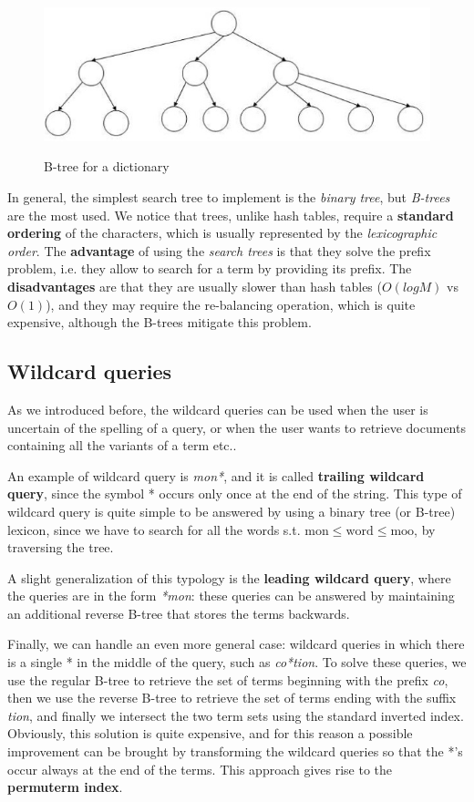 \begin{figure}[h!]
		\centering
		\includegraphics[scale = 1.8]{img/b tree.jpg}
		\label{b tree}
        \caption{B-tree for a dictionary}
\end{figure}

In general, the simplest search tree to implement is the \textit{binary tree}, but \textit{B-trees} are the most used. We notice that trees, unlike hash tables, require a \textbf{standard ordering} of the characters, which is usually represented by the \textit{lexicographic order}. The \textbf{advantage} of using the \textit{search trees} is that they solve the prefix problem, i.e. they allow to search for a term by providing its prefix. The \textbf{disadvantages} are that they are usually slower than hash tables ($O(log M)$ vs $O(1)$), and they may require the re-balancing operation, which is quite expensive, although the B-trees mitigate this problem.

\subsection{Wildcard queries}\label{4.2}
As we introduced before, the wildcard queries can be used when the user is uncertain of the spelling of a query, or when the user wants to retrieve documents containing all the variants of a term etc..

An example of wildcard query is \textit{mon*}, and it is called \textbf{trailing wildcard query}, since the symbol * occurs only once at the end of the string. This type of wildcard query is quite simple to be answered by using a binary tree (or B-tree) lexicon, since we have to search for all the words s.t. $\text{mon} \leq \text{word} \leq \text{moo}$, by traversing the tree.

A slight generalization of this typology is the \textbf{leading wildcard query}, where the queries are in the form \textit{*mon}: these queries can be answered by maintaining an additional reverse B-tree that stores the terms backwards.

Finally, we can handle an even more general case: wildcard queries in which there is a single * in the middle of the query, such as \textit{co*tion}. To solve these queries, we use the regular B-tree to retrieve the set of terms beginning with the prefix \textit{co}, then we use the reverse B-tree to retrieve the set of terms ending with the suffix \textit{tion}, and finally we intersect the two term sets using the standard inverted index. Obviously, this solution is quite expensive, and for this reason a possible improvement can be brought by transforming the wildcard queries so that the *'s occur always at the end of the terms. This approach gives rise to the \textbf{permuterm index}.

